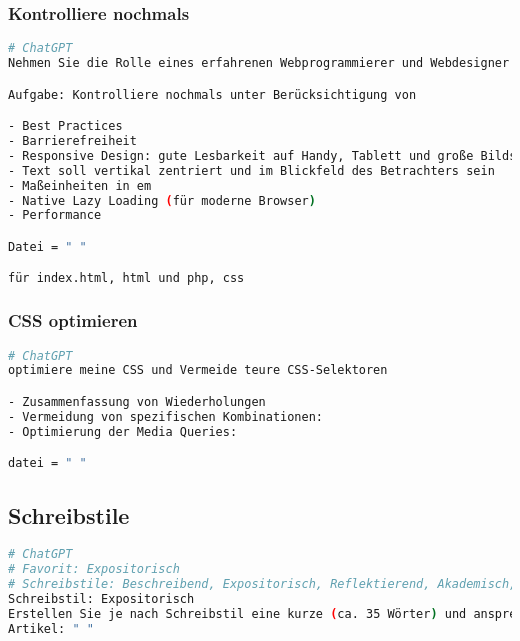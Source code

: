 \documentclass[12pt,a4paper]{scrartcl}
\begin{document}
\hypertarget{kontrolliere-nochmals}{%
\subsubsection{Kontrolliere nochmals}\label{kontrolliere-nochmals}}

\begin{lstlisting}[language=bash]
# ChatGPT
Nehmen Sie die Rolle eines erfahrenen Webprogrammierer und Webdesigner ein.

Aufgabe: Kontrolliere nochmals unter Berücksichtigung von

- Best Practices  
- Barrierefreiheit
- Responsive Design: gute Lesbarkeit auf Handy, Tablett und große Bildschirme
- Text soll vertikal zentriert und im Blickfeld des Betrachters sein
- Maßeinheiten in em
- Native Lazy Loading (für moderne Browser)
- Performance

Datei = " "

für index.html, html und php, css
\end{lstlisting}

\hypertarget{css-optimieren}{%
\subsubsection{CSS optimieren}\label{css-optimieren}}

\begin{lstlisting}[language=bash]
# ChatGPT
optimiere meine CSS und Vermeide teure CSS-Selektoren 

- Zusammenfassung von Wiederholungen
- Vermeidung von spezifischen Kombinationen:
- Optimierung der Media Queries: 

datei = " "
\end{lstlisting}

\hypertarget{schreibstile}{%
\subsection{Schreibstile}\label{schreibstile}}

\begin{lstlisting}[language=bash]
# ChatGPT
# Favorit: Expositorisch
# Schreibstile: Beschreibend, Expositorisch, Reflektierend, Akademisch, Kritisch
Schreibstil: Expositorisch
Erstellen Sie je nach Schreibstil eine kurze (ca. 35 Wörter) und ansprechende Zusammenfassung des folgenden Artikels. Die Zusammenfassung sollte für jemanden ohne wissenschaftlichen Hintergrund verständlich sein und gleichzeitig die wichtigsten Informationen genau wiedergeben. 
Artikel: " "
\end{lstlisting}
\end{document}
